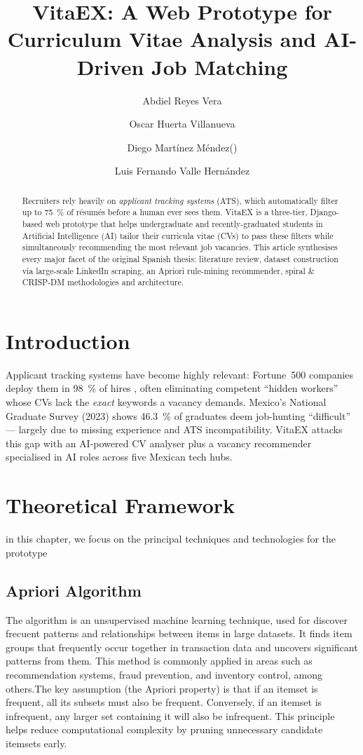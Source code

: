 \documentclass[runningheads]{llncs}
\title{VitaEX: A Web Prototype for Curriculum Vitae Analysis and AI-Driven Job Matching}
\author{
	Abdiel Reyes Vera\inst{1,2} \and
	Oscar Huerta Villanueva\inst{1} \and
	Diego Martínez Méndez\inst{1}(\Letter) \and 
	Luis Fernando Valle Hernández\inst{1} 
}
\institute{
	Escuela Superior de Cómputo, IPN, Mexico City, Mexico \\
	\texttt{\Letter~dmartinezm1707@alumno.ipn.mx} 
	\and
	Centro de Investigación en Computación, IPN, Mexico City, Mexico
}
\begin{document}
	\maketitle
	
	\begin{abstract}
		Recruiters rely heavily on \emph{applicant tracking systems} (ATS), which automatically filter up to 75~\% of résumés before a human ever sees them. VitaEX is a three-tier, Django-based web prototype that helps undergraduate and recently-graduated students in Artificial Intelligence (AI) tailor their curricula vitae (CVs) to pass these filters while simultaneously recommending the most relevant job vacancies. This article synthesises every major facet of the original Spanish thesis: literature review, dataset construction via large-scale LinkedIn scraping, an Apriori rule-mining recommender, spiral \& CRISP-DM methodologies and architecture.
		
		
		 
	\end{abstract}
	

	
	\section{Introduction}
	Applicant tracking systems have become highly relevant: Fortune~500 companies deploy them in 98~\% of hires \cite{ats1}, often eliminating competent “hidden workers” whose CVs lack the \emph{exact} keywords a vacancy demands. Mexico’s National Graduate Survey (2023) shows 46.3~\% \cite{uvm2023} of graduates deem job-hunting “difficult” — largely due to missing experience and ATS incompatibility. VitaEX attacks this gap with an AI-powered CV analyser plus a vacancy recommender specialised in AI roles across five Mexican tech hubs.
	
	\section{Theoretical Framework}
	in this chapter, we focus on the principal techniques and technologies for the prototype
	\subsection{Apriori Algorithm}
	
	The algorithm is an unsupervised machine learning technique, used for discover frecuent patterns and relationships between items in large datasets. It finds item groups that frequently occur together in transaction data and uncovers significant patterns from them. This method is commonly applied in areas such as recommendation systems, fraud prevention, and inventory control, among others.The key assumption (the Apriori property) is that if an itemset is frequent, all its subsets must also be frequent. Conversely, if an itemset is infrequent, any larger set containing it will also be infrequent. This principle helps reduce computational complexity by pruning unnecessary candidate itemsets early. \cite{ibm_apriori}
\end{document}
